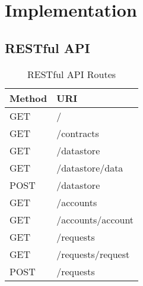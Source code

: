 \chapter{Implementation}
\label{implemenation}

\section{RESTful API}

\begin{table}[ht!]
\centering
\begin{tabular}{|l|l|}
\hline
 Method & URI  \\ \hline
 GET & /\  \\ \hline
 GET &  /contracts \\ \hline
 GET &  /datastore \\ \hline
 GET &  /datastore/{data} \\ \hline
 POST &  /datastore\\ \hline
 GET &  /accounts \\ \hline
 GET &  /accounts/{account} \\ \hline
 GET &  /requests \\ \hline
 GET &  /requests/{request} \\ \hline
 POST &  /requests \\ \hline
\end{tabular}
\caption{RESTful API Routes}
\label{table:api_routes}
\end{table}


